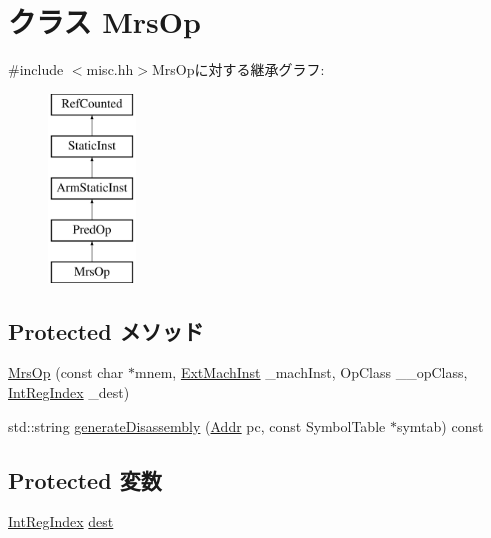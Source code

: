 \hypertarget{classMrsOp}{
\section{クラス MrsOp}
\label{classMrsOp}
}


{\ttfamily \#include $<$misc.hh$>$}MrsOpに対する継承グラフ:\begin{figure}[H]
\begin{center}
\leavevmode
\includegraphics[height=5cm]{classMrsOp}
\end{center}
\end{figure}
\subsection*{Protected メソッド}
\begin{DoxyCompactItemize}
\item 
\hyperlink{classMrsOp_a613f0eff39635ef68d126aa7b9656c76}{MrsOp} (const char $\ast$mnem, \hyperlink{classStaticInst_a5605d4fc727eae9e595325c90c0ec108}{ExtMachInst} \_\-machInst, OpClass \_\-\_\-opClass, \hyperlink{namespaceArmISA_ae64680ba9fb526106829d6bf92fc791b}{IntRegIndex} \_\-dest)
\item 
std::string \hyperlink{classMrsOp_a95d323a22a5f07e14d6b4c9385a91896}{generateDisassembly} (\hyperlink{classm5_1_1params_1_1Addr}{Addr} pc, const SymbolTable $\ast$symtab) const 
\end{DoxyCompactItemize}
\subsection*{Protected 変数}
\begin{DoxyCompactItemize}
\item 
\hyperlink{namespaceArmISA_ae64680ba9fb526106829d6bf92fc791b}{IntRegIndex} \hyperlink{classMrsOp_aec72e8e45bdc87abeeeb75d2a8a9a716}{dest}
\end{DoxyCompactItemize}


